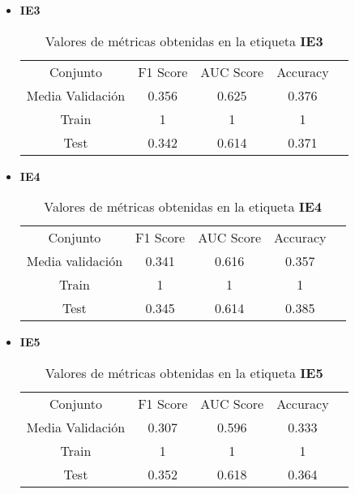 \begin{itemize}
	\item  \textbf{IE3}
	      \begin{table}[H]
		      \centering
		      \begin{tabular}{|c|c|c|c|c}
			      \cline{1-4}
			      Conjunto         & F1 Score & AUC Score & Accuracy \\ \cline{1-4}
			      Media Validación & 0.356    & 0.625     & 0.376    \\ \cline{1-4}
			      Train            & 1        & 1         & 1        \\ \cline{1-4}
			      Test             & 0.342    & 0.614     & 0.371    \\ \cline{1-4}
		      \end{tabular}
		      \caption{Valores de métricas obtenidas en la etiqueta \textbf{IE3}}
	      \end{table}
	\item  \textbf{IE4}
	      \begin{table}[H]
		      \centering
		      \begin{tabular}{|c|c|c|c|c}
			      \cline{1-4}
			      Conjunto         & F1 Score & AUC Score & Accuracy \\ \cline{1-4}
			      Media validación & 0.341    & 0.616     & 0.357    \\ \cline{1-4}
			      Train            & 1        & 1         & 1        \\ \cline{1-4}
			      Test             & 0.345    & 0.614     & 0.385    \\ \cline{1-4}
		      \end{tabular}
		      \caption{Valores de métricas obtenidas en la etiqueta \textbf{IE4}}
	      \end{table}
	\item  \textbf{IE5}
	      \begin{table}[H]
		      \centering
		      \begin{tabular}{|c|c|c|c|c}
			      \cline{1-4}
			      Conjunto         & F1 Score & AUC Score & Accuracy \\ \cline{1-4}
			      Media Validación & 0.307    & 0.596     & 0.333    \\ \cline{1-4}
			      Train            & 1        & 1         & 1        \\ \cline{1-4}
			      Test             & 0.352    & 0.618     & 0.364    \\ \cline{1-4}
		      \end{tabular}
		      \caption{Valores de métricas obtenidas en la etiqueta \textbf{IE5}}

\end{table}
\end{itemize}
